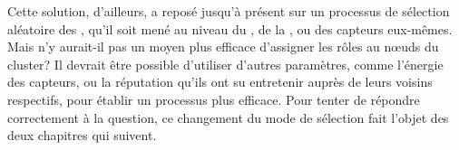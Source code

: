 Cette solution, d'ailleurs, a reposé jusqu'à présent sur un processus de sélection aléatoire des \cns, qu'il soit mené au niveau du \ch, de la \sdb, ou des capteurs eux-mêmes.
Mais n'y aurait-il pas un moyen plus efficace d'assigner les rôles au nœuds du cluster?
Il devrait être possible d'utiliser d'autres paramètres, comme l'énergie des capteurs, ou la réputation qu'ils ont su entretenir auprès de leurs voisins respectifs, pour établir un processus plus efficace.
Pour tenter de répondre correctement à la question, ce changement du mode de sélection fait l'objet des deux chapitres qui suivent.
